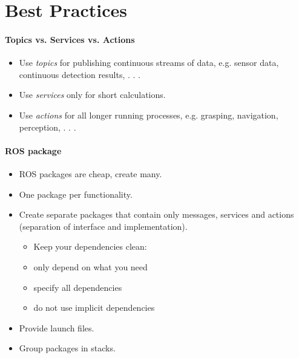 \section{Best Practices}
\paragraph{Topics vs. Services vs. Actions}
\begin{itemize}
\item Use \textit{topics} for publishing continuous streams of data, e.g. sensor data, continuous detection results, . . .\\
\item Use \textit{services} only for short calculations.\\
\item Use \textit{actions} for all longer running processes, e.g. grasping, navigation, perception, . . .
\end{itemize}


\paragraph{ROS package}
\begin{itemize}
\item ROS packages are cheap, create many.
\item One package per functionality.
\item Create separate packages that contain only messages, services and
actions (separation of interface and implementation).
\begin{itemize}
\item Keep your dependencies clean:
\item only depend on what you need
\item specify all dependencies 
\item do not use implicit dependencies
\end{itemize}
\item Provide launch files.
\item Group packages in stacks.
\end{itemize}


